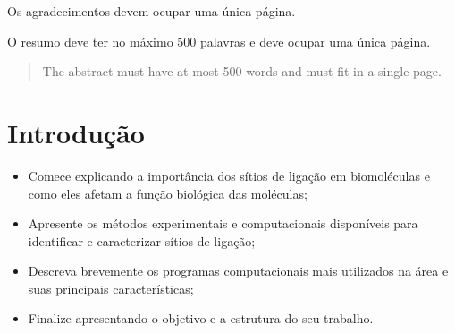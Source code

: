 \documentclass[Portugues]{phdquali}
\begin{document}
Os agradecimentos devem ocupar uma única página.


\begin{resumo}
O resumo deve ter no máximo 500 palavras e deve ocupar uma única página.
\end{resumo}


\begin{abstract}
The abstract must have at most 500 words and must fit in a single page.
\end{abstract}




\listoffigures

\listoftables





\tableofcontents


\fimdaspaginasiniciais


\chapter{Introdução}

\begin{itemize}
 \item Comece explicando a importância dos sítios de ligação em biomoléculas e como eles afetam a função biológica das moléculas;
 \item Apresente os métodos experimentais e computacionais disponíveis para identificar e caracterizar sítios de ligação;
 \item Descreva brevemente os programas computacionais mais utilizados na área e suas principais características;
 \item Finalize apresentando o objetivo e a estrutura do seu trabalho.
\end{itemize}
\end{document}
